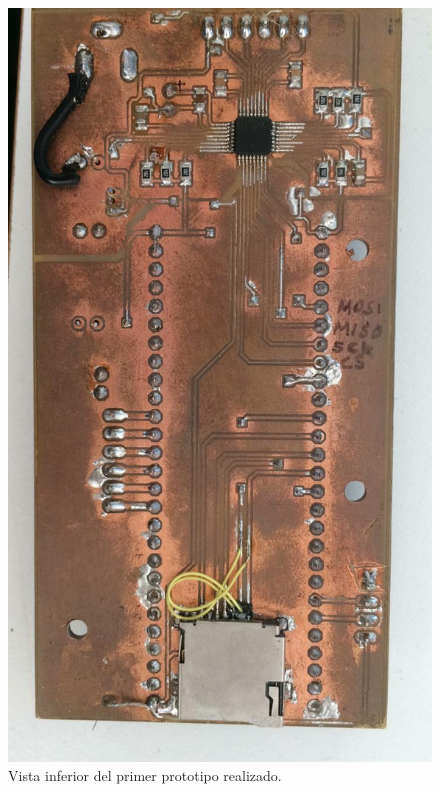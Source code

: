 \begin{figure}[!htbp]
	\centering
	
	\begin{minipage}{0.5\textwidth}
		\includegraphics[width=\textwidth]{./Figures/prototipo12.jpeg}		
	\end{minipage}		
	
	\caption{Vista inferior del primer prototipo realizado.}
	\label{fig:prototipo1inf}
\end{figure}


